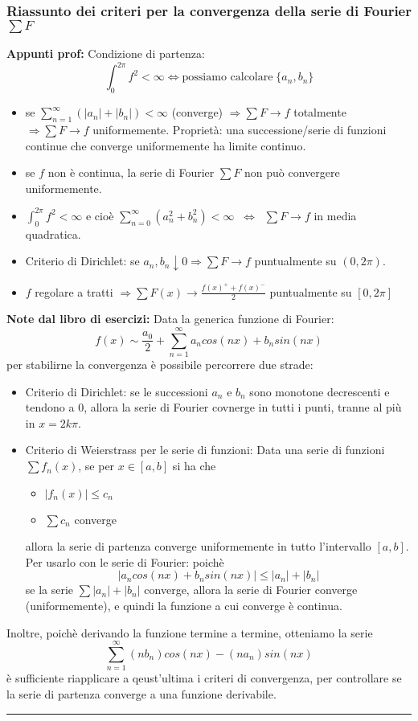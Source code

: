 \subsubsection*{Riassunto dei criteri per la convergenza della serie di Fourier $\sum F$}
\textbf{Appunti prof:}\newline
Condizione di partenza:
\[
    \int_{0}^{2\pi}f^2 < \infty \Leftrightarrow \text{possiamo calcolare}\;\{a_n, b_n\}
\]
\begin{itemize}
    \item se $\sum_{n=1}^{\infty}(|a_n| + |b_n|) < \infty$ (converge) $\Rightarrow \sum F \rightarrow f$ totalmente $\Rightarrow \sum F \rightarrow  f$ uniformemente.\newline
    Proprietà: una successione/serie di funzioni continue che converge uniformemente ha limite continuo.
    \item se $f$ non è continua, la serie di Fourier $\sum F$ non può convergere uniformemente.
    \item $\int_{0}^{2\pi}f^2 < \infty $ e cioè $\sum_{n=0}^{\infty}(a_n^2 + b_n^2)< \infty \;\;\Longleftrightarrow \;\;\sum F \rightarrow f$ in media quadratica.
    \item Criterio di Dirichlet: se $a_n, b_n \downarrow 0 \Rightarrow  \sum F \rightarrow f$ puntualmente su $(0,2\pi)$.
    \item $f$ regolare a tratti $\Rightarrow \sum F(x) \rightarrow  \frac{f(x)^+ + f(x)^-}{2}$ puntualmente su $[0,2\pi]$
\end{itemize}
\textbf{Note dal libro di esercizi:}\newline
Data la generica funzione di Fourier:
\[
    f(x) \sim  \frac{a_0}{2} + \sum_{n=1}^{\infty} a_n cos(nx) + b_n sin(nx)
\]
per stabilirne la convergenza è possibile percorrere due strade:
\begin{itemize}
    \item Criterio di Dirichlet: se le successioni $a_n$ e $b_n$ sono monotone decrescenti e tendono a $0$, allora la serie di Fourier covnerge in tutti i punti, tranne al più in $x = 2k\pi$.
    \item Criterio di Weierstrass per le serie di funzioni: Data una serie di funzioni $\sum f_n(x)$, se per $x \in [a,b]$ si ha che
    \begin{itemize}
        \item $|f_n(x)| \leq c_n$
        \item $\sum c_n$ converge
    \end{itemize}
    allora la serie di partenza converge uniformemente in tutto l'intervallo $[a,b]$.\newline
    Per usarlo con le serie di Fourier: poichè
    \[
        |a_n cos(nx) + b_n sin(nx)| \leq |a_n| + |b_n|
    \]
    se la serie $\sum |a_n| + |b_n|$ converge, allora la serie di Fourier converge (uniformemente), e quindi la funzione a cui converge è continua.
\end{itemize}
Inoltre, poichè derivando la funzione termine a termine, otteniamo la serie
\[
    \sum_{n=1}^{\infty} (n b_n ) cos(nx) - (n a_n)sin(nx)
\]
è sufficiente riapplicare a qeust'ultima i criteri di convergenza, per controllare se la serie di partenza converge a una funzione derivabile.\newline
\rule{\textwidth}{0,4pt}
